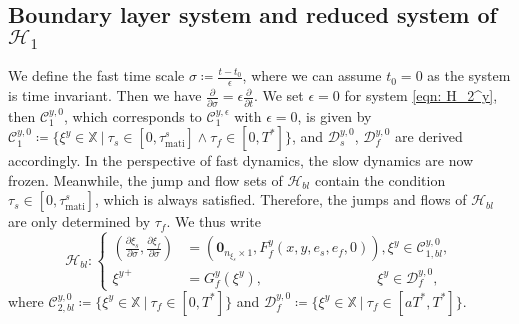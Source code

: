 \subsection{Boundary layer system and reduced system of $\mathcal{H}_1$}
 We define the fast time scale $\sigma \coloneqq \tfrac{t-t_0}{\epsilon}$, where we can assume $t_0 = 0$ as the system is time invariant. Then we have $\tfrac{\partial}{\partial \sigma} = \epsilon \tfrac{\partial}{\partial t}$. We set $\epsilon = 0$ for system \eqref{eqn: H_2^y}, then $\mathcal{C}_1^{y,0}$, which corresponds to $\mathcal{C}_1^{y,\epsilon}$ with $\epsilon = 0$, is given by $\mathcal{C}_1^{y,0} \coloneqq \{ \xi^y \in \mathbb{X} \ | \ \tau_s \in [0, \tau_\text{mati}^s]  \wedge \tau_f \in [0,  T^*] \}  $, and $\mathcal{D}_s^{y,0}$, $\mathcal{D}_f^{y,0}$ are derived accordingly. In the perspective of fast dynamics, the slow dynamics are now frozen. Meanwhile, the jump and flow sets of $\mathcal{H}_{bl}$ contain the condition $\tau_{s}\in [0, \tau_{\text{mati}}^s]$, which is always satisfied. Therefore, the jumps and flows of $\mathcal{H}_{bl}$ are only determined by $\tau_{f}$. We thus write
%
\begin{equation}
    \mathcal{H}_{bl}\! : \! \left\{
\begin{aligned}
    (\tfrac{\partial \xi_s}{\partial \sigma}, \tfrac{\partial \xi_f}{\partial \sigma} ) &= (\mathbf{0}_{n_{\xi_s}\! \times 1}, F_f^y(x,y,e_s,e_f,0) ), \xi^y \! \in \mathcal{C}_{1,bl}^{y,0}, \\
    {\xi^y}^+  &=   G_f^y(\xi^y), \qquad \qquad \qquad \qquad \, \xi^y \! \in \mathcal{D}_f^{y,0},
\end{aligned}
    \right.
    \label{eqn: H_bl}
\end{equation}
where $\mathcal{C}_{2,bl}^{y,0} \coloneqq \{\xi^y \in  \mathbb{X} \ | \ \tau_f \in [0, T^*]\}$ and $\mathcal{D}_f^{y,0}\coloneqq \{\xi^y \in  \mathbb{X} \ | \ \tau_f \in [aT^*, T^*] \}$. 


